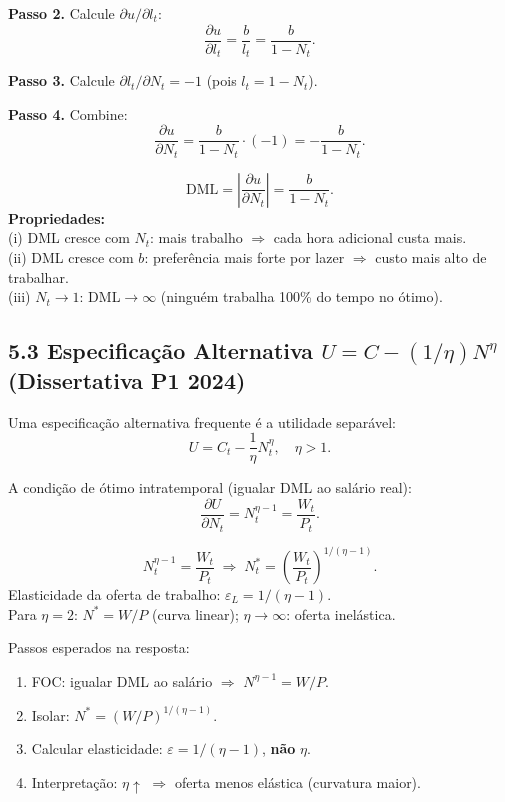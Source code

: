 \documentclass[12pt, a4paper]{article}
\begin{document}
\textbf{Passo 2.} Calcule $\partial u/\partial l_t$:
\[
\frac{\partial u}{\partial l_t} = \frac{b}{l_t} = \frac{b}{1-N_t}.
\]

\textbf{Passo 3.} Calcule $\partial l_t/\partial N_t = -1$ (pois $l_t = 1-N_t$).

\textbf{Passo 4.} Combine:
\[
\frac{\partial u}{\partial N_t} = \frac{b}{1-N_t}\cdot(-1) = -\frac{b}{1-N_t}.
\]

\begin{resultbox}[title={Desutilidade Marginal do Trabalho (DML)}]
\[
\text{DML} = \left|\frac{\partial u}{\partial N_t}\right| = \frac{b}{1-N_t}.
\]
\textbf{Propriedades:}\\
(i) DML cresce com $N_t$: mais trabalho $\Rightarrow$ cada hora adicional custa mais.\\
(ii) DML cresce com $b$: preferência mais forte por lazer $\Rightarrow$ custo mais alto de trabalhar.\\
(iii) $N_t\to 1$: DML$\to\infty$ (ninguém trabalha 100\% do tempo no ótimo).
\end{resultbox}

\subsection*{5.3 Especificação Alternativa $U = C - (1/\eta)N^\eta$ (Dissertativa P1 2024)}

Uma especificação alternativa frequente é a utilidade separável:
\[
U = C_t - \frac{1}{\eta}N_t^\eta, \quad \eta > 1.
\]

A condição de ótimo intratemporal (igualar DML ao salário real):
\[
\frac{\partial U}{\partial N_t} = N_t^{\eta-1} = \frac{W_t}{P_t}.
\]

\begin{formulabox}[title={Oferta de Trabalho com Utilidade Separável}]
\[
N_t^{\eta-1} = \frac{W_t}{P_t} \;\Longrightarrow\; N_t^* = \left(\frac{W_t}{P_t}\right)^{1/(\eta-1)}.
\]
Elasticidade da oferta de trabalho: $\varepsilon_L = 1/(\eta-1)$.\\
Para $\eta=2$: $N^* = W/P$ (curva linear); $\eta\to\infty$: oferta inelástica.
\end{formulabox}

\begin{provabox}[title={Q5 Dissertativa P1 2024 --- Passos Exigidos}]
Passos esperados na resposta:
\begin{enumerate}
\item FOC: igualar DML ao salário $\Rightarrow$ $N^{\eta-1} = W/P$.
\item Isolar: $N^* = (W/P)^{1/(\eta-1)}$.
\item Calcular elasticidade: $\varepsilon = 1/(\eta-1)$, \textbf{não} $\eta$.
\item Interpretação: $\eta\uparrow$ $\Rightarrow$ oferta menos elástica (curvatura maior).
\end{enumerate}
\end{provabox}
\end{document}
